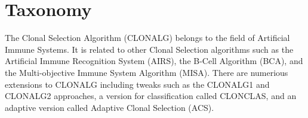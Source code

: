 \documentclass[a4paper, 11pt]{article}
\begin{document}
\section{Taxonomy}
\label{sec:taxonomy}
The Clonal Selection Algorithm (CLONALG) belongs to the field of Artificial Immune Systems.
It is related to other Clonal Selection algorithms such as the Artificial Immune Recognition System (AIRS), the B-Cell Algorithm (BCA), and the Multi-objective Immune System Algorithm (MISA).
There are numerious extensions to CLONALG including tweaks such as the CLONALG1 and CLONALG2 approaches, a version for classification called CLONCLAS,  and an adaptive version called Adaptive Clonal Selection (ACS).

\end{document}
